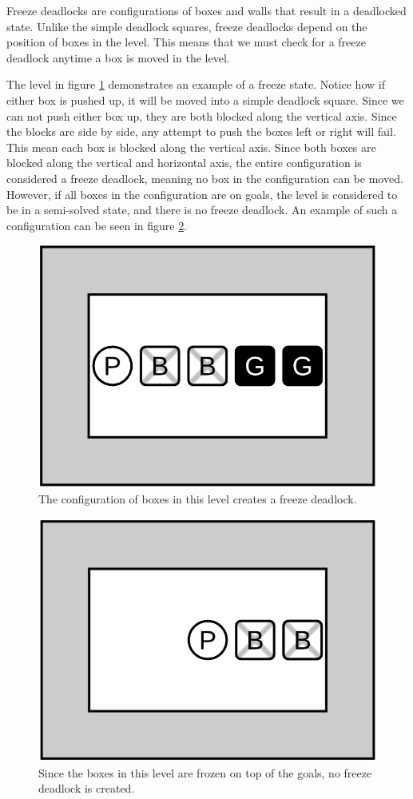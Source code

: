 \documentclass[times, 10pt,twocolumn]{article}
\begin{document}

Freeze deadlocks are configurations of boxes and walls that result in a deadlocked state. Unlike the simple deadlock squares, freeze deadlocks depend on the position of boxes in the level. This means that we must check for a freeze deadlock anytime a box is moved in the level. 

The level in figure \ref{fig:f} demonstrates an example of a freeze state. Notice how if either box is pushed up, it will be moved into a simple deadlock square. Since we can not push either box up, they are both blocked along the vertical axis. Since the blocks are side by side, any attempt to push the boxes left or right will fail. This mean each box is blocked along the vertical axis. Since both boxes are blocked along the vertical and horizontal axis, the entire configuration is considered a freeze deadlock, meaning no box in the configuration can be moved. However, if all boxes in the configuration are on goals, the level is considered to be in a semi-solved state, and there is no freeze deadlock. An example of such a configuration can be seen in figure \ref{fig:fok}.

\begin{figure}[h] 
  \centering
     \includegraphics[width=0.5\linewidth]{images/freeze_deadlock.png}
  \caption{The configuration of boxes in this level creates a freeze deadlock.}
  \label{fig:f}
\end{figure}

\begin{figure}[h] 
  \centering
     \includegraphics[width=0.5\linewidth]{images/freeze_deadlock_ok.png}
  \caption{Since the boxes in this level are frozen on top of the goals, no freeze deadlock is created.}
  \label{fig:fok}
\end{figure}
\end{document}
